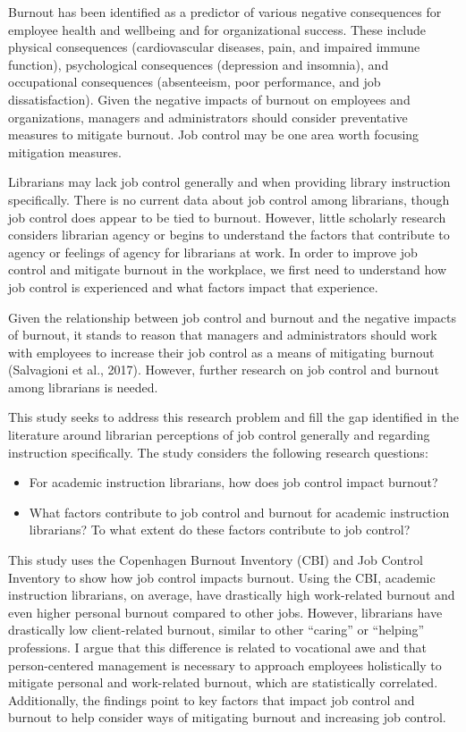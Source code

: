 \documentclass[
  twocolumn]{article}
\providecommand{\tightlist}{%
  \setlength{\itemsep}{0pt}\setlength{\parskip}{0pt}}
\begin{document}
Burnout has been identified as a predictor of various negative
consequences for employee health and wellbeing and for organizational
success. These include physical consequences (cardiovascular diseases,
pain, and impaired immune function), psychological consequences
(depression and insomnia), and occupational consequences (absenteeism,
poor performance, and job dissatisfaction). Given the negative impacts
of burnout on employees and organizations, managers and administrators
should consider preventative measures to mitigate burnout. Job control
may be one area worth focusing mitigation measures.

Librarians may lack job control generally and when providing library
instruction specifically. There is no current data about job control
among librarians, though job control does appear to be tied to burnout.
However, little scholarly research considers librarian agency or begins
to understand the factors that contribute to agency or feelings of
agency for librarians at work. In order to improve job control and
mitigate burnout in the workplace, we first need to understand how job
control is experienced and what factors impact that experience.

Given the relationship between job control and burnout and the negative
impacts of burnout, it stands to reason that managers and administrators
should work with employees to increase their job control as a means of
mitigating burnout (Salvagioni et al., 2017). However, further research
on job control and burnout among librarians is needed.

This study seeks to address this research problem and fill the gap
identified in the literature around librarian perceptions of job control
generally and regarding instruction specifically. The study considers
the following research questions:

\begin{itemize}
\tightlist
\item
  For academic instruction librarians, how does job control impact
  burnout?
\item
  What factors contribute to job control and burnout for academic
  instruction librarians? To what extent do these factors contribute to
  job control?
\end{itemize}

This study uses the Copenhagen Burnout Inventory (CBI) and Job Control
Inventory to show how job control impacts burnout. Using the CBI,
academic instruction librarians, on average, have drastically high
work-related burnout and even higher personal burnout compared to other
jobs. However, librarians have drastically low client-related burnout,
similar to other ``caring'' or ``helping'' professions. I argue that
this difference is related to vocational awe and that person-centered
management is necessary to approach employees holistically to mitigate
personal and work-related burnout, which are statistically correlated.
Additionally, the findings point to key factors that impact job control
and burnout to help consider ways of mitigating burnout and increasing
job control.
\end{document}
